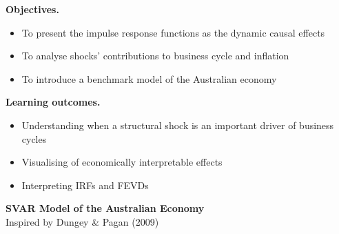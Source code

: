 \documentclass[notes,blackandwhite,mathsans,usenames,dvipsnames]{beamer}
\begin{document}
{
\begin{frame}

\bigskip\textbf{\color{mcxs1}Objectives.}
\begin{itemize}[label=$\blacktriangleright$]
\item {\color{mcxs1}To present the impulse response functions as the dynamic causal effects}
\item {\color{mcxs1}To analyse shocks' contributions to business cycle and inflation}
\item {\color{mcxs1}To introduce a benchmark model of the Australian economy}
\end{itemize}

\bigskip\textbf{\color{mcxs2}Learning outcomes.}
\begin{itemize}[label=$\blacktriangleright$]
\item {\color{mcxs2}Understanding when a structural shock is an important driver of business cycles}
\item {\color{mcxs2}Visualising of economically interpretable effects}
\item {\color{mcxs2}Interpreting IRFs and FEVDs}
\end{itemize}

\end{frame}
}









{
\begin{frame}

\begin{adjustwidth}{-0.5cm}{0cm}
\Large
\textbf{{\color{mcxs1}SVAR Model of the} {\color{mcxs2}Australian Economy}}\\[31ex]
\small{\color{mcxs1}Inspired by Dungey \& Pagan (2009)}
\end{adjustwidth}

\end{frame}
}
\end{document}
